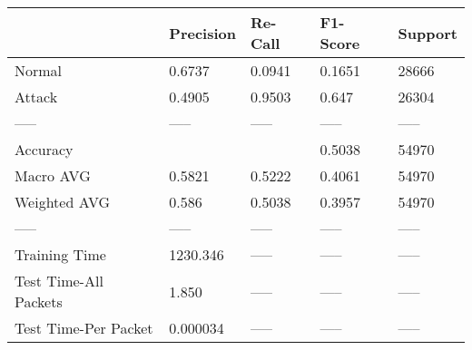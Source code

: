 \begin{tabular}{lllll}
\toprule
{} & Precision & Re-Call & F1-Score & Support \\
\midrule
Normal                &    0.6737 &  0.0941 &   0.1651 &   28666 \\
Attack                &    0.4905 &  0.9503 &    0.647 &   26304 \\
-----                 &     ----- &   ----- &    ----- &   ----- \\
Accuracy              &           &         &   0.5038 &   54970 \\
Macro AVG             &    0.5821 &  0.5222 &   0.4061 &   54970 \\
Weighted AVG          &     0.586 &  0.5038 &   0.3957 &   54970 \\
-----                 &     ----- &   ----- &    ----- &   ----- \\
Training Time         &  1230.346 &   ----- &    ----- &   ----- \\
Test Time-All Packets &     1.850 &   ----- &    ----- &   ----- \\
Test Time-Per Packet  &  0.000034 &   ----- &    ----- &   ----- \\
\bottomrule
\end{tabular}
